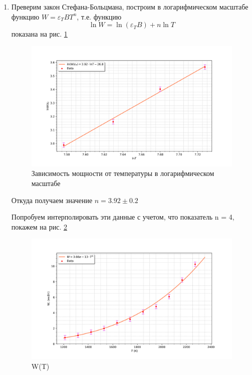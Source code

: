 \documentclass[a4paper]{article}
\begin{document}
\begin{enumerate}
    \item Преверим закон Стефана-Больцмана, построим в логарифмическом масштабе функцию $W = \varepsilon_T B T^n$,
    т.е. функцию
    $$\ln{W} = \ln{(\varepsilon_T B)} + n \ln{T}$$
    показана на рис. \ref{graph2}
    \begin{figure}[H]
        \begin{center}
        \includegraphics[scale = 0.5]{ln(We_t)1.png}
        \caption{Зависимость мощности от температуры в логарифмическом масштабе}
        \label{graph2}
        \end{center}
    \end{figure}
    Откуда получаем значение $n = 3.92 \pm 0.2 $ \par 
    Попробуем интерполировать эти данные с учетом, что показатель n = 4, покажем на рис. \ref{graph3}
    \begin{figure}[H]
        \begin{center}
        \includegraphics[scale = 0.5]{W(t)fit2.png}
        \caption{W(T)}
        \label{graph3}
        \end{center}
    \end{figure}


\end{enumerate}
\end{document}
